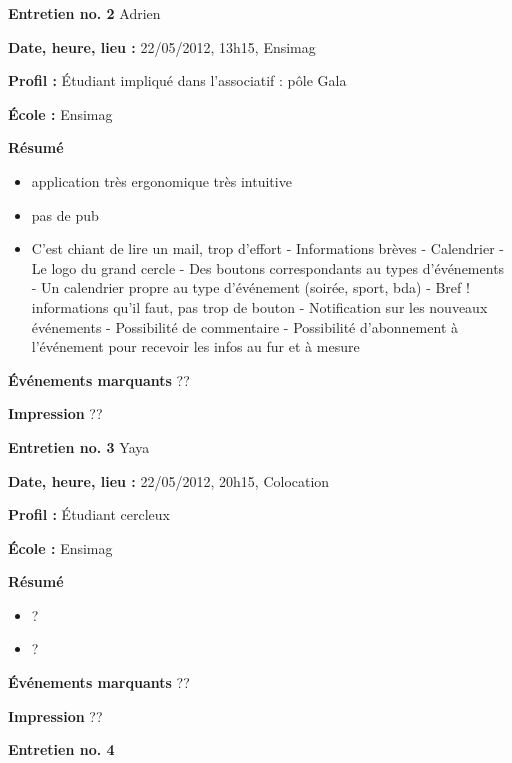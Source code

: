 \documentclass[a4paper, 11px]{article}
\begin{document}


\vspace{.3cm}

 \textbf {\large Entretien no. 2}
Adrien

\textbf{Date, heure, lieu : }
22/05/2012, 13h15, Ensimag

\textbf{Profil : }
Étudiant impliqué dans l'associatif : pôle Gala

\textbf{École : }
Ensimag

\textbf{Résumé}
	\begin{itemize}
		\item application très ergonomique très intuitive
		\item pas de pub
		\item C’est chiant de lire un mail, trop d'effort
	- Informations brèves
	- Calendrier
	- Le logo du grand cercle
	- Des boutons correspondants au types d'événements
	- Un calendrier propre au type d'événement (soirée, sport, bda)
	- Bref ! informations qu'il faut, pas trop de bouton
	- Notification sur les nouveaux événements
	- Possibilité de commentaire
	- Possibilité d'abonnement à l'événement pour recevoir les infos au fur et à mesure
	\end{itemize}

\textbf{Événements marquants}
??

\textbf{Impression}
??



\vspace{.3cm}

 \textbf {\large Entretien no. 3}
Yaya

\textbf{Date, heure, lieu : }
22/05/2012, 20h15, Colocation

\textbf{Profil : }
Étudiant cercleux

\textbf{École : }
Ensimag

\textbf{Résumé}
	\begin{itemize}
		\item ?
		\item ?
	\end{itemize}

\textbf{Événements marquants}
??

\textbf{Impression}
??



\vspace{.3cm}

 \textbf {\large Entretien no. 4}
\end{document}
